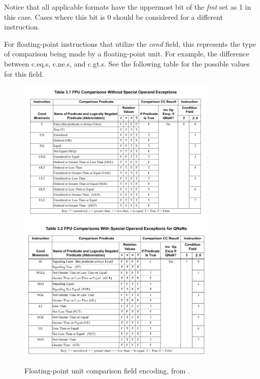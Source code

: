 \documentclass[
    paper=letter,
    parskip=half,
    fontsize=12pt,
    titlepage=firstiscover,
    toc=bibliography,
    numbers=endperiod
]{scrartcl}
\begin{document}
Notice that all applicable formats have the uppermost bit of the
\emph{fmt} set as 1 in this case. Cases where this bit is 0 should be
considered for a different instruction.

For floating-point instructions that utilize the \emph{cond} field, this
represents the type of comparison being made by a floating-point unit.
For example, the difference between c.eq.s, c.ne.s, and c.gt.s. See the
following table for the possible values for this field.

\begin{figure}[H]
    \begin{minipage}{\textwidth}
        \begin{center}
            \includegraphics[width=0.85\textwidth]{fpu-cond-encoding-1}
            \includegraphics[width=0.85\textwidth]{fpu-cond-encoding-2}
        \end{center}
    \end{minipage}
    \caption{Floating-point unit comparison field encoding, from \protect\cite{mips-specification}.}
\end{figure}
\end{document}
